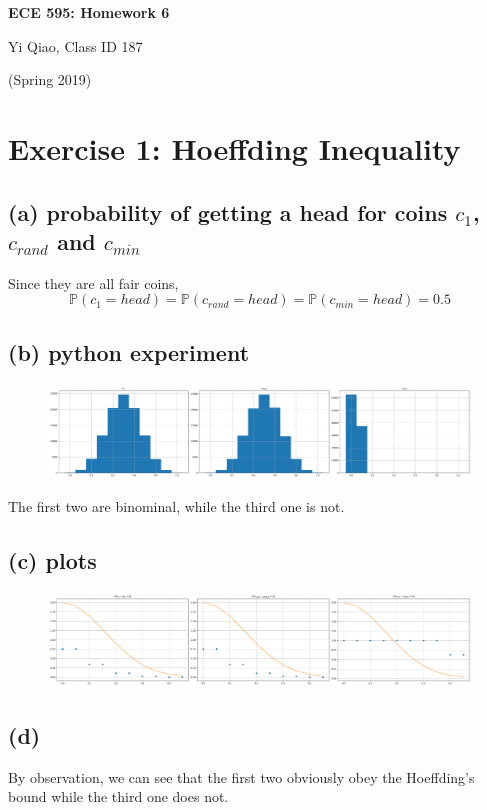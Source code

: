 \documentclass[11pt]{article}
\begin{document}
\begin{center}
\Large{\textbf{ECE 595: Homework 6}}

Yi Qiao, Class ID 187

(Spring 2019)
\end{center}

\section*{Exercise 1: Hoeffding Inequality}
\subsection*{(a) probability of getting a head for coins $c_1$, $c_{rand}$ and $c_{min}$}
Since they are all fair coins,
$$\mathbb{P}(c_1=head)=\mathbb{P}(c_{rand}=head)=\mathbb{P}(c_{min}=head)=0.5$$
\subsection*{(b) python experiment}
\begin{figure}[h]
	\centering
	\includegraphics[width=\linewidth]{exercise1_b}
\end{figure}

The first two are binominal, while the third one is not.
\subsection*{(c) plots}
\begin{figure}[h]
	\centering
	\includegraphics[width=\linewidth]{exercise1_c}
\end{figure}
\subsection*{(d)}
By observation, we can see that the first two obviously obey the Hoeffding's bound while the third one does not.
\end{document}
